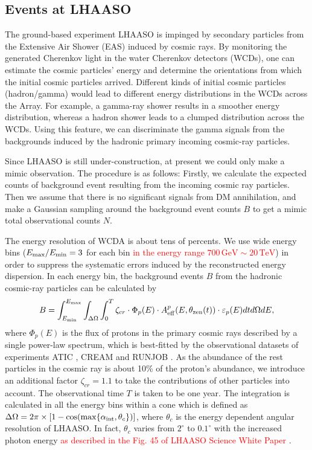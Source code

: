 \documentclass[12pt,aps,prd,amsmath,amssymb,showpacs,floats,floatfix,nofootinbib]{revtex4-1}
\def\red#1{{\textcolor{red}{#1}}} %
\def\TeV{\mathrm{TeV}} %
\def\GeV{\mathrm{GeV}} %
\begin{document}
\subsection{Events at LHAASO}\label{sec:events}

The ground-based experiment LHAASO is impinged by secondary particles from the Extensive Air Shower (EAS) induced by cosmic rays.
By monitoring the generated Cherenkov light in the water Cherenkov detectors (WCDs), one can estimate the cosmic particles' energy and determine the orientations from which the initial cosmic particles arrived.
Different kinds of initial cosmic particles (hadron/gamma) would lead to different energy distributions in the WCDs across the Array.
For example, a gamma-ray shower results in a smoother energy distribution, whereas a hadron shower leads to a clumped distribution across the WCDs.
Using this feature, we can discriminate the gamma signals from the backgrounds induced by the hadronic primary incoming cosmic-ray particles.

Since LHAASO is still under-construction, at present we could only make a mimic observation.
The procedure is as follows: Firstly, we calculate the expected counts of background event resulting from the incoming cosmic ray particles. Then we assume that there is no significant signals from DM annihilation, and make a Gaussian sampling around the background event counts $B$ to get a mimic total observational counts $N$.

The energy resolution of WCDA is about tens of percents.
We use wide energy bins ($E_{\rm max}/E_{\rm min}=3$ for each bin \red{in the energy range $700\,\GeV\sim20\,\TeV$}) in order to suppress the systematic errors induced by the reconstructed energy dispersion.
In each energy bin, the background events $B$ from the hadronic cosmic-ray particles can be calculated by
\begin{equation}\label{func:bkg}
  B=\int^{E_{\rm max}}_{E_{\rm min}}\int_{\Delta\Omega}\int_0^T\zeta_{cr}\cdot\Phi_{p}(E)\cdot A_{\rm eff}^{p}(E,\theta_{\rm zen}(t))\cdot\varepsilon_{p}(E)dtd\Omega dE,
\end{equation}
where $\Phi_{p}(E)$ is the flux of protons in the primary cosmic rays described by a single power-law spectrum, which is best-fitted by the observational datasets of experiments ATIC \cite{Panov:2011ak}, CREAM \cite{Yoon:2011aa} and RUNJOB \cite{Derbina:2005ta}.
As the abundance of the rest particles in the cosmic ray is about 10\% of the proton's abundance, we introduce an additional factor $\zeta_{cr}=1.1$ to take the contributions of other particles into account. The observational time $T$ is taken to be one year.
The integration is calculated in all the energy bins within a cone which is defined as $\Delta\Omega=2\pi\times[1-\cos(\max\{ \alpha_{\rm int}, \theta_c \})]$, where $\theta_c$ is the energy dependent angular resolution of LHAASO. In fact, $\theta_c$ varies from $2^\circ$ to $0.1^\circ$ with the increased photon energy \red{as described in the Fig. 45 of LHAASO Science White Paper \cite{Bai:2019khm}}.
\end{document}
